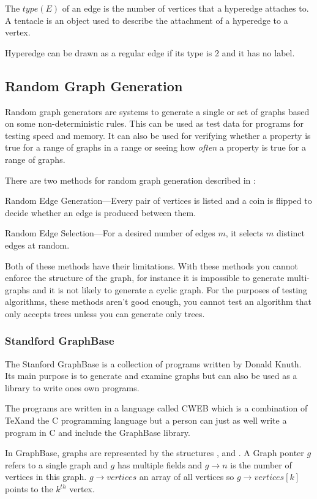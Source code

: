   The $type(E)$ of an edge is the number of vertices that a hyperedge attaches to. A tentacle is an object used to describe the attachment of a hyperedge to a vertex.

  Hyperedge can be drawn as a regular edge if its type is 2 and it has no label.


  

\subsection{Random Graph Generation}
  Random graph generators are systems to generate a single or set of graphs based on some non-deterministic rules. This can be used as test data for programs for testing speed and memory. It can also be used for verifying whether a property is true for a range of graphs in a range or seeing how \emph{often} a property is true for a range of graphs.

  There are two methods for random graph generation described in \cite{Skiena}:

  Random Edge Generation---Every pair of vertices is listed and a coin is flipped to decide whether an edge is produced between them.

  Random Edge Selection---For a desired number of edges $m$, it selects $m$ distinct edges at random.

  Both of these methods have their limitations. With these methods you cannot enforce the structure of the graph, for instance it is impossible to generate multi-graphs and it is not likely to generate a cyclic graph. For the purposes of testing algorithms, these methods aren't good enough, you cannot test an algorithm that only accepts trees unless you can generate only trees.

  \subsubsection{Standford GraphBase}
    The Stanford GraphBase is a collection of programs written by Donald Knuth. Its main purpose is to generate and examine graphs but can also be used as a library to write ones own programs. 

    The programs are written in a language called CWEB which is a combination of \TeX and the C programming language but a person can just as well write a program in C and include the GraphBase library. 

    In GraphBase, graphs are represented by the structures ,  and . A Graph ponter $g$ refers to a single graph and $g$ has multiple fields and $g \to n$ is the number of vertices in this graph. $g \to vertices$ an array of all vertices so $g \to vertices[k]$ points to the $k^{th}$ vertex.

